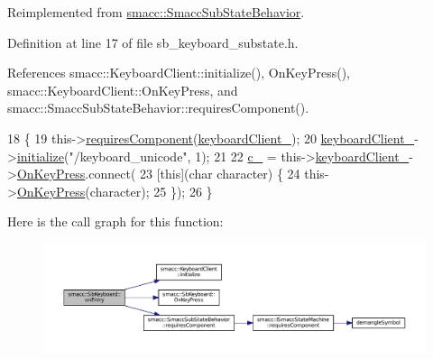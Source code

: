 Reimplemented from \hyperlink{classsmacc_1_1SmaccSubStateBehavior_a7c28e1c46238bbb2c2e0450573c6de94}{smacc\+::\+Smacc\+Sub\+State\+Behavior}.



Definition at line 17 of file sb\+\_\+keyboard\+\_\+substate.\+h.



References smacc\+::\+Keyboard\+Client\+::initialize(), On\+Key\+Press(), smacc\+::\+Keyboard\+Client\+::\+On\+Key\+Press, and smacc\+::\+Smacc\+Sub\+State\+Behavior\+::requires\+Component().


\begin{DoxyCode}
18         \{
19                 this->\hyperlink{classsmacc_1_1SmaccSubStateBehavior_a4d25c4ba8ec01c489df172a71bb1c37d}{requiresComponent}(\hyperlink{classsmacc_1_1SbKeyboard_af1dd6f1c0f3e8d7222a13a185b649726}{keyboardClient\_});
20                 \hyperlink{classsmacc_1_1SbKeyboard_af1dd6f1c0f3e8d7222a13a185b649726}{keyboardClient\_}->\hyperlink{classsmacc_1_1KeyboardClient_a0f845a83b14ff666559e90e3861ff207}{initialize}(\textcolor{stringliteral}{"/keyboard\_unicode"}, 1);
21 
22                 \hyperlink{classsmacc_1_1SbKeyboard_a3dca4a0e69f1e2d306c98d22c620816c}{c\_} = this->\hyperlink{classsmacc_1_1SbKeyboard_af1dd6f1c0f3e8d7222a13a185b649726}{keyboardClient\_}->\hyperlink{classsmacc_1_1KeyboardClient_a715d1f764a8c6da3b7b2c26fe785dee5}{OnKeyPress}.connect(
23                     [\textcolor{keyword}{this}](\textcolor{keywordtype}{char} character) \{
24                             this->\hyperlink{classsmacc_1_1SbKeyboard_ac0eaa959e1dccf55bd8b2ec5afafe50f}{OnKeyPress}(character);
25                     \});
26         \}
\end{DoxyCode}


Here is the call graph for this function\+:
\nopagebreak
\begin{figure}[H]
\begin{center}
\leavevmode
\includegraphics[width=350pt]{classsmacc_1_1SbKeyboard_ac8a485f7d89b8173ae17d9b190105f21_cgraph}
\end{center}
\end{figure}


